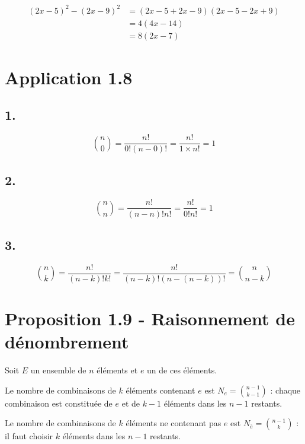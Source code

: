 \documentclass{report}
\begin{document}
\begin{equation*}
	\begin{split}
		(2x-5)^2 - (2x - 9)^2 &= (2x-5+2x-9)(2x-5-2x+9) \\
		&= 4(4x-14) \\
		&= 8(2x-7)
	\end{split}
\end{equation*}



\section*{Application 1.8}

\subsection*{1.}

\begin{displaymath}
	\binom{n}{0}= \frac{n!}{0!(n-0)!}= \frac{n!}{1 \times n!}=1
\end{displaymath}

\subsection*{2.}
\begin{displaymath}
	\binom{n}{n}= \frac{n!}{(n-n)!n!}= \frac{n!}{0!n!}=1
\end{displaymath}


\subsection*{3.}
\begin{displaymath}
	\binom{n}{k}= \frac{n!}{(n-k)!k!}= \frac{n!}{(n-k)!(n-(n-k))!}=\binom{n}{n-k}
\end{displaymath}



\section*{Proposition 1.9 - Raisonnement de dénombrement}

Soit $E$ un ensemble de $n$ éléments et $e$ un de ces éléments.

Le nombre de combinaisons de $k$ éléments contenant $e$ est $N_e = \binom{n-1}{k-1}$ : chaque combinaison est
constituée de $e$ et de $k-1$ éléments dans les $n-1$ restants.

Le nombre de combinaisons de $k$ éléments ne contenant pas $e$ est $N_{\bar{e}} = \binom{n-1}{k}$ : il faut choisir $k$ éléments dans les $n-1$ restants.
\end{document}
